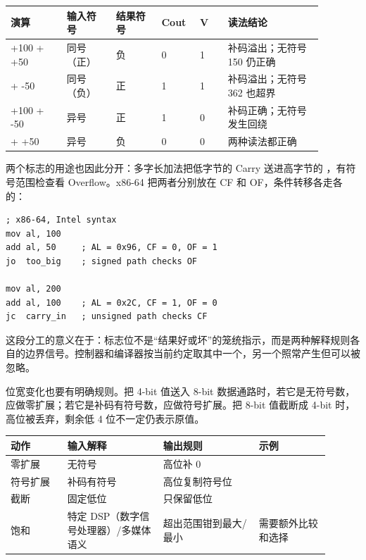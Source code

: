 \begin{longtable}{L{0.16\linewidth}L{0.14\linewidth}L{0.13\linewidth}L{0.1\linewidth}L{0.08\linewidth}L{0.27\linewidth}}
\toprule
演算 & 输入符号 & 结果符号 & Cout & V & 读法结论 \\
\midrule
+100 + +50 & 同号（正） & 负 & 0 & 1 & 补码溢出；无符号 150 仍正确 \\ + -50 & 同号（负） & 正 & 1 & 1 & 补码溢出；无符号 362 也超界 \\\tablerowrule
+100 + -50 & 异号 & 正 & 1 & 0 & 补码正确；无符号发生回绕 \\ + +50 & 异号 & 负 & 0 & 0 & 两种读法都正确 \\
\bottomrule
\end{longtable}

两个标志的用途也因此分开：多字长加法把低字节的 Carry 送进高字节的 ，有符号范围检查看 Overflow。x86-64 把两者分别放在 CF 和 OF，条件转移各走各的：

\begin{lstlisting}
; x86-64, Intel syntax
mov al, 100
add al, 50     ; AL = 0x96, CF = 0, OF = 1
jo  too_big    ; signed path checks OF

mov al, 200
add al, 100    ; AL = 0x2C, CF = 1, OF = 0
jc  carry_in   ; unsigned path checks CF
\end{lstlisting}

这段分工的意义在于：标志位不是“结果好或坏”的笼统指示，而是两种解释规则各自的边界信号。控制器和编译器按当前约定取其中一个，另一个照常产生但可以被忽略。

位宽变化也要有明确规则。把 4-bit 值送入 8-bit 数据通路时，若它是无符号数，应做零扩展；若它是补码有符号数，应做符号扩展。把 8-bit 值截断成 4-bit 时，高位被丢弃，剩余低 4 位不一定仍表示原值。

\begin{longtable}{L{0.16\linewidth}L{0.27\linewidth}L{0.27\linewidth}L{0.2\linewidth}}
\toprule
动作 & 输入解释 & 输出规则 & 示例 \\
\midrule
零扩展 & 无符号 & 高位补 0 &  \\\tablerowrule
符号扩展 & 补码有符号 & 高位复制符号位 &  \\\tablerowrule
截断 & 固定低位 & 只保留低位 &  \\\tablerowrule
饱和 & 特定 DSP（数字信号处理器）/多媒体语义 & 超出范围钳到最大/最小 & 需要额外比较和选择 \\
\bottomrule
\end{longtable}

